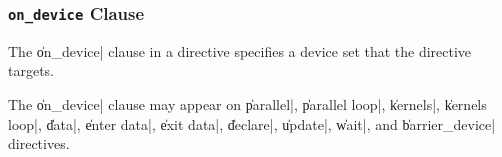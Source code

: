 


\subsubsection{{\tt on\_device} Clause}





The \|on_device| clause in a directive specifies a device set that the
directive targets.

The \|on_device| clause may appear on \|parallel|, \|parallel loop|,
\|kernels|, \|kernels loop|, \|data|, \|enter data|, 
\|exit data|, \|declare|, \|update|, \|wait|, and \|barrier_device|
directives.

